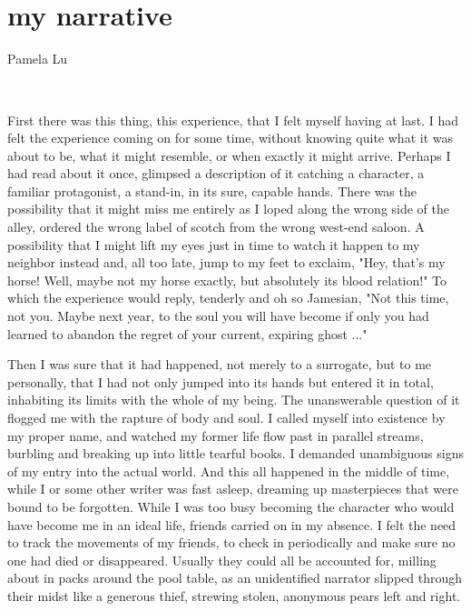 ~

~

\hypertarget{my-narrative}{%
\section{my narrative}\label{my-narrative}}

Pamela Lu

~

First there was this thing, this experience, that I felt myself having
at last. I had felt the experience coming on for some time, without
knowing quite what it was about to be, what it might resemble, or when
exactly it might arrive. Perhaps I had read about it once, glimpsed a
description of it catching a character, a familiar protagonist, a
stand-in, in its sure, capable hands. There was the possibility that it
might miss me entirely as I loped along the wrong side of the alley,
ordered the wrong label of scotch from the wrong west-end saloon. A
possibility that I might lift my eyes just in time to watch it happen to
my neighbor instead and, all too late, jump to my feet to exclaim, "Hey,
that's my horse! Well, maybe not my horse exactly, but absolutely its
blood relation!" To which the experience would reply, tenderly and oh so
Jamesian, "Not this time, not you. Maybe next year, to the soul you will
have become if only you had learned to abandon the regret of your
current, expiring ghost ..."

Then I was sure that it had happened, not merely to a surrogate, but to
me personally, that I had not only jumped into its hands but entered it
in total, inhabiting its limits with the whole of my being. The
unanswerable question of it flogged me with the rapture of body and
soul. I called myself into existence by my proper name, and watched my
former life flow past in parallel streams, burbling and breaking up into
little tearful books. I demanded unambiguous signs of my entry into the
actual world. And this all happened in the middle of time, while I or
some other writer was fast asleep, dreaming up masterpieces that were
bound to be forgotten. While I was too busy becoming the character who
would have become me in an ideal life, friends carried on in my absence.
I felt the need to track the movements of my friends, to check in
periodically and make sure no one had died or disappeared. Usually they
could all be accounted for, milling about in packs around the pool
table, as an unidentified narrator slipped through their midst like a
generous thief, strewing stolen, anonymous pears left and right.

